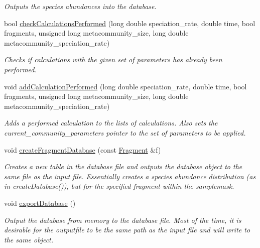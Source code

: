 \begin{DoxyCompactItemize}
\begin{DoxyCompactList}\small\item\em Outputs the species abundances into the database. \end{DoxyCompactList}\item 
bool \hyperlink{group___community_objects_a7a1c541651f7b2326db2334233072d04}{check\+Calculations\+Performed} (long double speciation\+\_\+rate, double time, bool fragments, unsigned long metacommunity\+\_\+size, long double metacommunity\+\_\+speciation\+\_\+rate)
\begin{DoxyCompactList}\small\item\em Checks if calculations with the given set of parameters has already been performed. \end{DoxyCompactList}\item 
void \hyperlink{group___community_objects_a28f6996de89e7596da6777cc55e9861d}{add\+Calculation\+Performed} (long double speciation\+\_\+rate, double time, bool fragments, unsigned long metacommunity\+\_\+size, long double metacommunity\+\_\+speciation\+\_\+rate)
\begin{DoxyCompactList}\small\item\em Adds a performed calculation to the lists of calculations. Also sets the current\+\_\+community\+\_\+parameters pointer to the set of parameters to be applied. \end{DoxyCompactList}\item 
void \hyperlink{group___community_objects_ad6515ff43ea8189a1acdcccfe893bbba}{create\+Fragment\+Database} (const \hyperlink{struct_fragment}{Fragment} \&f)
\begin{DoxyCompactList}\small\item\em Creates a new table in the database file and outputs the database object to the same file as the input file. Essentially creates a species abundance distribution (as in create\+Database()), but for the specified fragment within the samplemask. \end{DoxyCompactList}\item 
void \hyperlink{group___community_objects_a280850bd6077692755cc419028aa5d67}{export\+Database} ()
\begin{DoxyCompactList}\small\item\em Output the database from memory to the database file. Most of the time, it is desirable for the outputfile to be the same path as the input file and will write to the same object. \end{DoxyCompactList}\item 

\end{DoxyCompactItemize}
